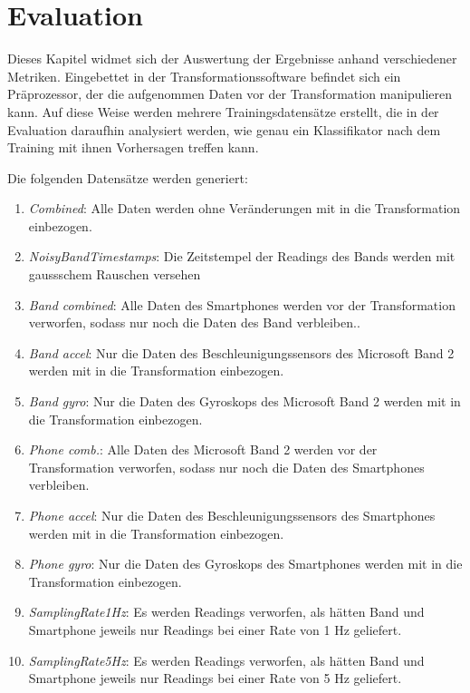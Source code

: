 \chapter{Evaluation}
\label{chap:evaluation}

Dieses Kapitel widmet sich der Auswertung der Ergebnisse anhand verschiedener Metriken. Eingebettet in der Transformationssoftware befindet sich ein Präprozessor, der die aufgenommen Daten vor der Transformation manipulieren kann. Auf diese Weise werden mehrere Trainingsdatensätze erstellt, die in der Evaluation daraufhin analysiert werden, wie genau ein Klassifikator nach dem Training mit ihnen Vorhersagen treffen kann.

Die folgenden Datensätze werden generiert:

\begin{enumerate}
\item \textit{Combined}: Alle Daten werden ohne Veränderungen mit in die Transformation einbezogen.
\item \textit{NoisyBandTimestamps}: Die Zeitstempel der Readings des Bands werden mit gaussschem Rauschen versehen
\item \textit{Band combined}: Alle Daten des Smartphones werden vor der Transformation verworfen, sodass nur noch die Daten des Band verbleiben..
\item \textit{Band accel}: Nur die Daten des Beschleunigungssensors des Microsoft Band 2 werden mit in die Transformation einbezogen.
\item \textit{Band gyro}: Nur die Daten des Gyroskops des Microsoft Band 2 werden mit in die Transformation einbezogen.
\item \textit{Phone comb.}: Alle Daten des Microsoft Band 2 werden vor der Transformation verworfen, sodass nur noch die Daten des Smartphones verbleiben.
\item \textit{Phone accel}: Nur die Daten des Beschleunigungssensors des Smartphones werden mit in die Transformation einbezogen.
\item \textit{Phone gyro}: Nur die Daten des Gyroskops des Smartphones werden mit in die Transformation einbezogen.
\item \textit{SamplingRate1Hz}: Es werden Readings verworfen, als hätten Band und Smartphone jeweils nur Readings bei einer Rate von 1 Hz geliefert.
\item \textit{SamplingRate5Hz}: Es werden Readings verworfen, als hätten Band und Smartphone jeweils nur Readings bei einer Rate von 5 Hz geliefert.
\end{enumerate}

